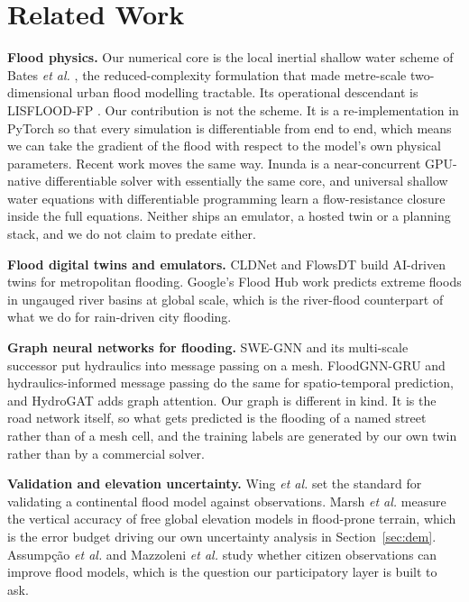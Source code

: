 \documentclass[journal]{IEEEtran}
\begin{document}
\section{Related Work}
\textbf{Flood physics.} Our numerical core is the local inertial shallow water scheme of Bates
\emph{et al.} \cite{bates2010}, the reduced-complexity formulation that made metre-scale
two-dimensional urban flood modelling tractable. Its operational descendant is LISFLOOD-FP
\cite{shaw2021lisflood}. Our contribution is not the scheme. It is a re-implementation in PyTorch
so that every simulation is differentiable from end to end, which means we can take the gradient of
the flood with respect to the model's own physical parameters. Recent work moves the same way.
Inunda \cite{li2026inunda} is a near-concurrent GPU-native differentiable solver with essentially
the same core, and universal shallow water equations with differentiable programming
\cite{liu2025uswe} learn a flow-resistance closure inside the full equations. Neither ships an
emulator, a hosted twin or a planning stack, and we do not claim to predate either.

\textbf{Flood digital twins and emulators.} CLDNet \cite{cldnet2026} and FlowsDT \cite{flowsdt2026}
build AI-driven twins for metropolitan flooding. Google's Flood Hub work \cite{nearing2024}
predicts extreme floods in ungauged river basins at global scale, which is the river-flood
counterpart of what we do for rain-driven city flooding.

\textbf{Graph neural networks for flooding.} SWE-GNN \cite{bentivoglio2023swegnn} and its
multi-scale successor \cite{bentivoglio2025mswegnn} put hydraulics into message passing on a mesh.
FloodGNN-GRU \cite{kazadi2024gru} and hydraulics-informed message passing \cite{kazadi2024icml} do
the same for spatio-temporal prediction, and HydroGAT \cite{hydrogat2025} adds graph attention. Our
graph is different in kind. It is the road network itself, so what gets predicted is the flooding
of a named street rather than of a mesh cell, and the training labels are generated by our own twin
rather than by a commercial solver.

\textbf{Validation and elevation uncertainty.} Wing \emph{et al.} \cite{wing2017} set the standard
for validating a continental flood model against observations. Marsh \emph{et al.} \cite{marsh2024}
measure the vertical accuracy of free global elevation models in flood-prone terrain, which is the
error budget driving our own uncertainty analysis in Section~\ref{sec:dem}. Assump\c{c}\~ao
\emph{et al.} \cite{assumpcao2018} and Mazzoleni \emph{et al.} \cite{mazzoleni2017} study whether
citizen observations can improve flood models, which is the question our participatory layer is
built to ask.
\end{document}

